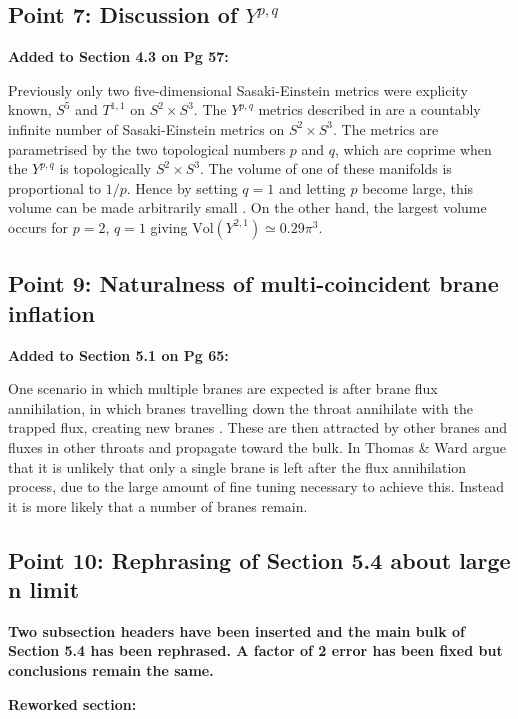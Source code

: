 \subsection{Point 7: Discussion of $Y^{p,q}$}
\textbf{Added to Section 4.3 on Pg 57:}

Previously only two five-dimensional Sasaki-Einstein
metrics were explicity known, $S^5$ and $T^{1,1}$ on $S^2\times S^3$. The $Y^{p,q}$ metrics
described in  are a countably infinite number of Sasaki-Einstein metrics on
$S^2\times S^3$. The metrics are parametrised by the two topological numbers $p$ and $q$, which are
coprime when the $Y^{p,q}$ is topologically $S^2\times S^3$. The volume of one of these manifolds
is proportional to $1/p$. Hence by setting $q=1$ and letting $p$ become large, this volume can be
made arbitrarily small \cite{gauntlett}. On the other hand, the largest volume occurs for $p=2$,
$q=1$ giving $\mathrm{Vol}(Y^{2,1})\simeq 0.29\pi^3$. 

\subsection{Point 9: Naturalness of multi-coincident brane inflation}
\textbf{Added to Section 5.1 on Pg 65:}

One scenario in which multiple branes are expected is after brane flux annihilation, in which
branes travelling down the throat annihilate with the trapped flux, creating new branes
\cite{thomasward, DeWolfe:2004qx, Kachru:2002gs}. These are then attracted by other branes and
fluxes in other throats and propagate toward the bulk.
In  Thomas \& Ward argue that it is unlikely that only a single brane is left
after the flux annihilation process, due to the large amount of fine tuning necessary to achieve
this. Instead it is more likely that a number of branes remain.

\subsection{Point 10: Rephrasing of Section 5.4 about large n limit}
\textbf{Two subsection headers have been inserted and the main bulk of Section 5.4 has been
rephrased. A factor of 2 error has been fixed but conclusions remain the same.}

\textbf{Reworked section:}

